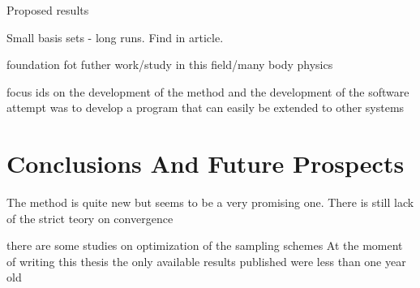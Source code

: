 \documentclass[twoside,english]{uiofysmaster}
\begin{document}
Proposed results

Small basis sets - long runs. Find in article.



foundation fot futher work/study in this field/many body physics

focus ids on the development of the method and the development of the software
attempt was to develop a program that can easily be extended to other systems



\section{Conclusions And Future Prospects}

The method is quite new but seems to be a very promising one. There is still lack of the strict teory on convergence 

there are some studies on optimization of the sampling schemes
At the moment of writing this thesis the only available results published were less than one year old


\appendix
\renewcommand{\thesection}{\Alph{section}.\arabic{section}}
\setcounter{section}{0}
\end{document}
